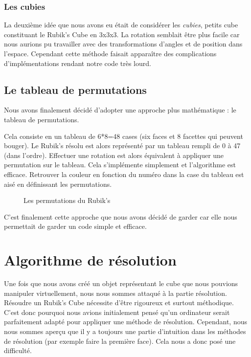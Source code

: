 \subsubsection{Les cubies}
La deuxième idée que nous avons eu était de considérer les \textit{cubies}, petits cube constituant le Rubik's Cube en 3x3x3.
La rotation semblait être plus facile car nous aurions pu travailler avec des transformations d'angles et de position dans l'espace.
Cependant cette méthode faisait apparaître des complications d'implémentations rendant notre code très lourd.

\subsection{Le tableau de permutations}
Nous avons finalement décidé d'adopter une approche plus mathématique : le tableau de permutations.

Cela consiste en un tableau de 6*8=48 cases (six faces et 8 facettes qui peuvent bouger).
Le Rubik's résolu est alors représenté par un tableau rempli de 0 à 47 (dans l'ordre).
Effectuer une rotation est alors équivalent à appliquer une permutation sur le tableau.
Cela s'implémente simplement et l'algorithme est efficace.
Retrouver la couleur en fonction du numéro dans la case du tableau est aisé en définissant les permutations.

\begin{figure}[h]
\begin{center}
\end{center}
    \caption{Les permutations du Rubik's}
\end{figure}

C'est finalement cette approche que nous avons décidé de garder car elle nous permettait de garder un code simple et efficace.

\section{Algorithme de résolution}
Une fois que nous avons créé un objet représentant le cube que nous pouvions manipuler virtuellement, nous nous sommes attaqué à la partie résolution.
Résoudre un Rubik's Cube nécessite d'être rigoureux et surtout méthodique.
C'est donc pourquoi nous avions initialement pensé qu'un ordinateur serait parfaitement adapté pour appliquer une méthode de résolution.
Cependant, nous nous sommes aperçu que il y a toujours une partie d'intuition dans les méthodes de résolution (par exemple faire la première face).
Cela nous a donc posé une difficulté.

